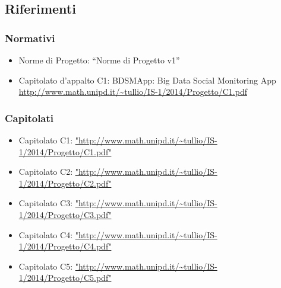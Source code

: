 \subsection{Riferimenti}

\subsubsection{Normativi}
\begin{itemize}
\item Norme di Progetto: “Norme di Progetto v1”
\item Capitolato d’appalto C1: BDSMApp: Big Data Social Monitoring App \url{http://www.math.unipd.it/~tullio/IS-1/2014/Progetto/C1.pdf}
\end{itemize}
\subsubsection{Capitolati}
\begin{itemize}
\item Capitolato C1: \url{"http://www.math.unipd.it/~tullio/IS-1/2014/Progetto/C1.pdf"}
\item Capitolato C2: \url{"http://www.math.unipd.it/~tullio/IS-1/2014/Progetto/C2.pdf"}
\item Capitolato C3: \url{"http://www.math.unipd.it/~tullio/IS-1/2014/Progetto/C3.pdf"}
\item Capitolato C4: \url{"http://www.math.unipd.it/~tullio/IS-1/2014/Progetto/C4.pdf"}
\item Capitolato C5: \url{"http://www.math.unipd.it/~tullio/IS-1/2014/Progetto/C5.pdf"}
\end{itemize}